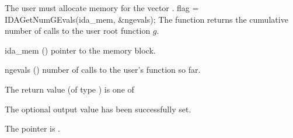 {{  {\warn}The user must allocate memory for the vector .
}
{
  flag = IDAGetNumGEvals(ida\_mem, \&ngevals);
}
{
  The function  returns the cumulative
  number of calls to the user root function $g$.
}
{
  \begin{args}
  \item[ida\_mem] ()
    pointer to the {\ida} memory block.
  \item[ngevals] ()
    number of calls to the user's function  so far.
  \end{args}
}
{
  The return value  (of type ) is one of
  \begin{args}
  \item[\Id{IDA\_SUCCESS}] 
    The optional output value has been successfully set.
  \item[\Id{IDA\_MEM\_NULL}]
    The  pointer is .
  \end{args}
}
{}



}
